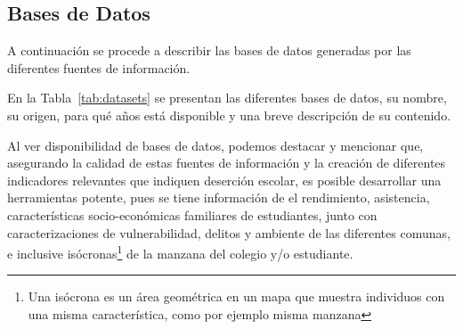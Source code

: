 
\subsection{Bases de Datos}
A continuación se procede a describir las bases de datos generadas por las diferentes fuentes de información. 

En la Tabla~\ref{tab:datasets} se presentan las diferentes bases de datos, su nombre, su origen, para qué años está disponible y una breve descripción de su contenido.

Al ver disponibilidad de bases de datos, podemos destacar y mencionar que, asegurando la calidad de estas fuentes de información y la creación de diferentes indicadores relevantes que indiquen deserción escolar, es posible desarrollar una herramientas potente, pues se tiene información de el rendimiento, asistencia, características socio-económicas familiares de estudiantes, junto con caracterizaciones de vulnerabilidad, delitos y ambiente de las diferentes comunas, e inclusive isócronas\footnote{Una isócrona es un área geométrica en un mapa que muestra individuos con una misma característica, como por ejemplo misma manzana} de la manzana del colegio y/o estudiante.

